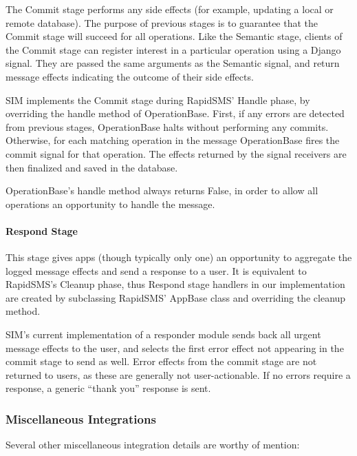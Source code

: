 \documentclass{acm_proc_article-sp}
\begin{document}
The Commit stage performs any side effects (for example, updating a local or remote database). The purpose of previous stages is to guarantee that the Commit stage will succeed for all operations. Like the Semantic stage, clients of the Commit stage can register interest in a particular operation using a Django signal. They are passed the same arguments as the Semantic signal, and return message effects indicating the outcome of their side effects.

SIM implements the Commit stage during RapidSMS’ Handle phase, by overriding the handle method of OperationBase. First, if any errors are detected from previous stages, OperationBase halts without performing any commits. Otherwise, for each matching operation in the message OperationBase fires the commit signal for that operation. The effects returned by the signal receivers are then finalized and saved in the database.

OperationBase’s handle method always returns False, in order to allow all operations an opportunity to handle the message.

\paragraph{Respond Stage}

This stage gives apps (though typically only one) an opportunity to aggregate the logged message effects and send a response to a user. It  is equivalent to RapidSMS’s Cleanup phase, thus Respond stage handlers in our implementation are created by subclassing RapidSMS’ AppBase class and overriding the cleanup method.

SIM’s current implementation of a responder module sends back all urgent message effects to the user, and selects the first error effect not appearing in the commit stage to send as well. Error effects from the commit stage are not returned to users, as these are generally not user-actionable. If no errors require a response, a generic “thank you” response is sent.

\subsubsection{Miscellaneous Integrations}

Several other miscellaneous integration details are worthy of mention:
\end{document}

